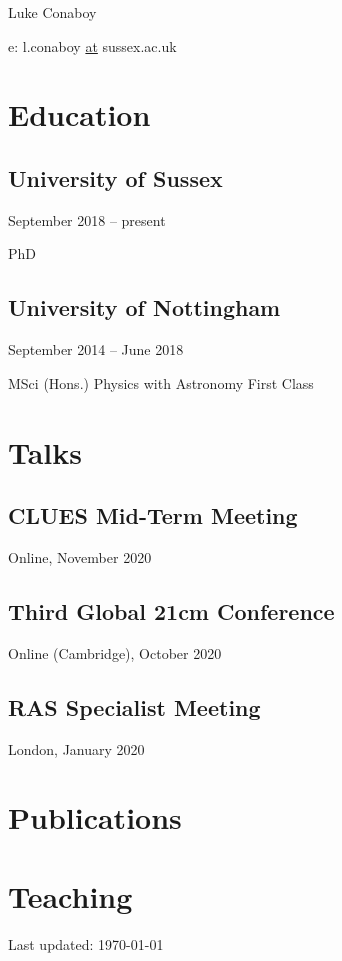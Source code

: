 \documentclass{article}
\author{lc589}
\date{\today}
\title{}
\begin{document}
\tableofcontents

Luke Conaboy

e: l.conaboy \uline{at} sussex.ac.uk

\section{Education}
\label{sec:orgf205207}
\subsection{University of Sussex}
\label{sec:org6410a4f}
September 2018 -- present

PhD 
\subsection{University of Nottingham}
\label{sec:org95f092a}
September 2014 -- June 2018

MSci (Hons.) Physics with Astronomy First Class

\section{Talks}
\label{sec:orge3d6988}
\subsection{CLUES Mid-Term Meeting}
\label{sec:org8fb26ef}
Online, November 2020
\subsection{Third Global 21cm Conference}
\label{sec:org3d607b8}
Online (Cambridge), October 2020
\subsection{RAS Specialist Meeting}
\label{sec:org7ac4845}
London, January 2020

\section{Publications}
\label{sec:org98b8192}

\section{Teaching}
\label{sec:orgff8b0c2}

Last updated: \today
\end{document}
